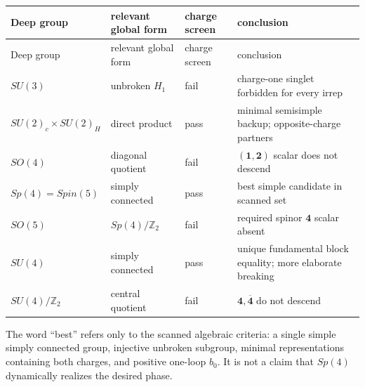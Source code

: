 \documentclass[11pt]{article}
\theoremstyle{definition}
\theoremstyle{remark}
\newcommand{\ZZ}{\mathbb Z}
\begin{document}
\begin{longtable}{@{}L{0.17\textwidth}L{0.20\textwidth}L{0.18\textwidth}L{0.35\textwidth}@{}}
\toprule
Deep group & relevant global form & charge screen & conclusion\\
\midrule
\endfirsthead
\toprule
Deep group & relevant global form & charge screen & conclusion\\
\midrule
\endhead
\(SU(3)\) & unbroken \(H_1\) & fail & charge-one singlet forbidden for every irrep\\
\(SU(2)_c\times SU(2)_H\) & direct product & pass & minimal semisimple backup; opposite-charge partners\\
\(SO(4)\) & diagonal quotient & fail & \((\bm1,\bm2)\) scalar does not descend\\
\(Sp(4)=Spin(5)\) & simply connected & pass & best simple candidate in scanned set\\
\(SO(5)\) & \(Sp(4)/\ZZ_2\) & fail & required spinor \(\bm4\) scalar absent\\
\(SU(4)\) & simply connected & pass & unique fundamental block equality; more elaborate breaking\\
\(SU(4)/\ZZ_2\) & central quotient & fail & \(\bm4,\overline{\bm4}\) do not descend\\
\bottomrule
\end{longtable}

The word ``best'' refers only to the scanned algebraic criteria: a single
simple simply connected group, injective unbroken subgroup, minimal
representations containing both charges, and positive one-loop \(b_0\).
It is not a claim that \(Sp(4)\) dynamically realizes the desired phase.
\end{document}
